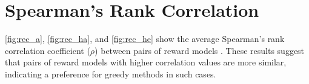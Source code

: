 
\newpage
\section{Spearman's Rank Correlation \citep{spearman1904proof}}\label{ap:recol}
\cref{fig:rec_a}, \cref{fig:rec_ha}, and \cref{fig:rec_he} show the average Spearman's rank correlation coefficient ($\rho$) between pairs of reward models \citep{spearman1904proof}.
These results suggest that pairs of reward models with higher correlation values are more similar, indicating a preference for greedy methods in such cases. 



